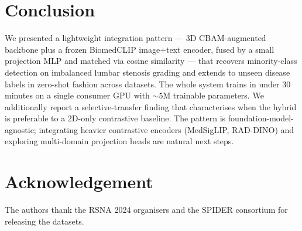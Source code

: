 \section{Conclusion}
\label{sec:conclusion}

We presented a lightweight integration pattern — 3D CBAM-augmented
backbone plus a frozen BiomedCLIP image+text encoder, fused by a small
projection MLP and matched via cosine similarity — that recovers
minority-class detection on imbalanced lumbar stenosis grading and
extends to unseen disease labels in zero-shot fashion across datasets.
The whole system trains in under 30 minutes on a single consumer GPU
with $\sim 5$M trainable parameters. We additionally report a
selective-transfer finding that characterises when the hybrid is
preferable to a 2D-only contrastive baseline. The pattern is
foundation-model-agnostic; integrating heavier contrastive encoders
(MedSigLIP, RAD-DINO) and exploring multi-domain projection heads are
natural next steps.

\section*{Acknowledgement}
The authors thank the RSNA 2024 organisers and the SPIDER consortium
for releasing the datasets.

